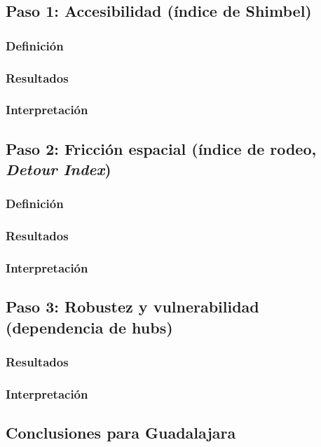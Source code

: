         \subsection{Paso 1: Accesibilidad (índice de Shimbel)}
            \subsubsection{Definición}
            \subsubsection{Resultados}
            \subsubsection{Interpretación}
        \subsection{Paso 2: Fricción espacial (índice de rodeo, \textit{Detour Index})}
            \subsubsection{Definición}
            \subsubsection{Resultados}
            \subsubsection{Interpretación}
        \subsection{Paso 3: Robustez y vulnerabilidad (dependencia de hubs)}
            \subsubsection{Resultados}
            \subsubsection{Interpretación}
        \subsection{Conclusiones para Guadalajara}
